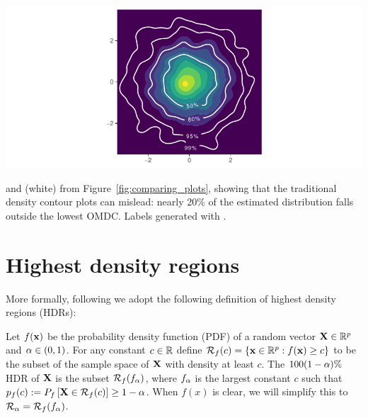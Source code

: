 \begin{knitrout}
\color{fgcolor}\begin{widefigure}[h!]

{\centering \includegraphics[width=\maxwidth]{figures/comparing_plots-2-1}

}

\caption{ and  (white) from Figure~\ref{fig:comparing_plots}, showing that the traditional density contour plots can mislead: nearly 20\% of the estimated distribution falls outside the lowest OMDC. Labels generated with  \citep{geomtextpath}.}\label{fig:comparing_plots-2}
\end{widefigure}

\end{knitrout}



\pagebreak


\section{Highest density regions}\label{sec:hdrs}

More formally, following \cite{hyndman_computing_1996}  we adopt the following definition of highest density regions (HDRs):

\begin{definition}\label{def:HDR}
Let $f(\textbf{x})$ be the probability density function (PDF) of a random vector $\textbf{X} \in \mathbb{R}^{p}$ and $\alpha \in (0,1)$.
For any constant $c \in \mathbb{R}$ define $\mathcal{R}_{f}(c) = \{\textbf{x} \in \mathbb{R}^{p}: f(\textbf{x}) \geq c\}$ to be the subset of the sample space of $\textbf{X}$ with density at least $c$. The $100(1 - \alpha)\%$ HDR of $\textbf{X}$ is the subset $\mathcal{R}_{f}(f_{\alpha})$, where $f_{\alpha}$ is the largest constant $c$ such that $p_{f}(c) := P_{f}\left[\textbf{X} \in \mathcal{R}_f(c)\right] \geq 1 - \alpha$. When $f(x)$ is clear, we will simplify this to $\mathcal{R}_{\alpha} = \mathcal{R}_{f}(f_{\alpha})$.
\end{definition}

